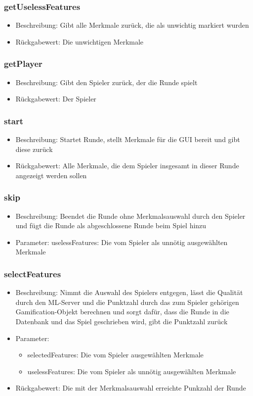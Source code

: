 \documentclass[a4paper]{scrreprt}
\begin{document}
	\subsubsection{getUselessFeatures}
	\begin{itemize}
		\item Beschreibung: Gibt alle Merkmale zurück, die als unwichtig markiert wurden
		\item Rückgabewert: Die unwichtigen Merkmale
	\end{itemize}
	\subsubsection{getPlayer}
		\begin{itemize}
			\item Beschreibung: Gibt den Spieler zurück, der die Runde spielt
			\item Rückgabewert: Der Spieler
		\end{itemize}
	\subsubsection{start}
		\begin{itemize}
			\item Beschreibung: Startet Runde, stellt Merkmale für die GUI bereit und gibt diese zurück
			\item Rückgabewert: Alle Merkmale, die dem Spieler insgesamt in dieser Runde angezeigt werden sollen
		\end{itemize}
	\subsubsection{skip}
		\begin{itemize}
			\item Beschreibung: Beendet die Runde ohne Merkmalsauswahl durch den Spieler und fügt die Runde als abgeschlossene Runde beim Spiel hinzu
			\item Parameter: uselessFeatures: Die vom Spieler als unnötig ausgewählten Merkmale
		\end{itemize}
	\subsubsection{selectFeatures}
	\begin{itemize}
	\item Beschreibung: Nimmt die Auswahl des Spielers entgegen, lässt die Qualität durch den ML-Server und die Punktzahl durch das zum Spieler gehörigen Gamification-Objekt berechnen und sorgt dafür, dass die Runde in die Datenbank und das Spiel geschrieben wird, gibt die Punktzahl zurück
	\item Parameter:
	\begin{itemize}
	 \item selectedFeatures: Die vom Spieler ausgewählten Merkmale
	 \item uselessFeatures: Die vom Spieler als unnötig ausgewählten Merkmale
	 \end{itemize}
	\item Rückgabewert: Die mit der Merkmalsauswahl erreichte Punkzahl der Runde
	\end{itemize}
\end{document}
